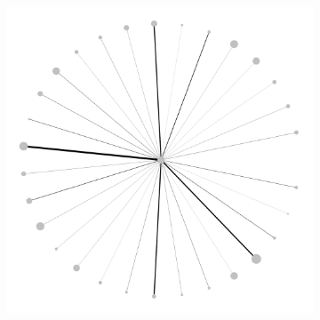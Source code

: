 \documentclass[varwidth, border=0pt]{standalone}
\begin{document}
\begin{figure}
\begin{subfigure}{0.24\linewidth}
		\end{subfigure}~%
		\begin{subfigure}{0.24\linewidth}
			\includegraphics[width=\linewidth]{../../graphics/evolution/reliance-de-wphg-2019.pdf}%
		\end{subfigure}
			\end{figure}%
\end{document}

